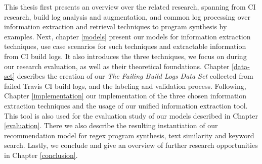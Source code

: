 \documentclass[\myrootdir/main.tex]{subfiles}
\begin{document}
This thesis first presents an overview over the related research, spanning from CI research, build log analysis and augmentation, and common  log processing over information extraction and retrieval techniques to program synthesis by examples.
Next, chapter \ref{models} present our models for information extraction techniques, use case scenarios for such techniques and extractable information from CI build logs. It also introduces the three techniques, we focus on during our research evaluation, as well as their theoretical foundations.
Chapter \ref{data-set} describes the creation of our \emph{The Failing Build Logs Data Set} collected from failed Travis CI build logs, and the labeling and validation process.
Following, Chapter \ref{implementation} our implementation of the three chosen information extraction techniques and the usage of our unified information extraction tool.
This tool is also used for the evaluation study of our models described in Chapter \ref{evaluation}. There we also describe the resulting instantiation of our recommendation model for regex program synthesis, text similarity and keyword search.
Lastly, we conclude and give an overview of further research opportunities in Chapter \ref{conclusion}.
\end{document}
